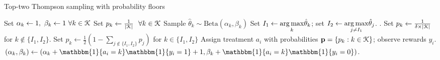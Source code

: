 \documentclass[letterpaper, 12pt, parskip=full,DIV=10]{scrartcl}
\begin{document}
\begin{algorithm} \footnotesize
    \caption{Top-two Thompson sampling with probability floors}
    \label{algg:ttts}
    \begin{algorithmic}[1] %
    	\State Set  $\alpha_{k} \leftarrow 1, \ \beta_{k} \leftarrow 1\ \forall k \in {\EuScript K}$%
			 \State Set $p_{k} \leftarrow \frac{1 }{|{\EuScript K}| } \ \ \forall k \in {\EuScript K} $ 
		\Else 	
				\State Sample $\hat \theta_k  \sim \textrm{Beta}\left(\alpha_{k}, \beta_{k} \right)$ 
			 \EndFor
			\State Set $I_1 \leftarrow \underset{k}{\operatorname*{arg\,max}} \hat\theta_k$; set $I_2 \leftarrow \underset{j\neq I_1}{\operatorname*{arg\,max}} \hat\theta_j$. . 
			\State Set $p_k \leftarrow \frac{1 }{\delta \times |{\EuScript K}| } $ for $k \notin \{ I_1, I_2\} $. 
			\State Set $p_k \leftarrow \frac{1}{2} (1-  \sum\limits_{j \notin \{ I_1, I_2\} } p_j) $ for $k \in \{ I_1, I_2\} $ 
		\EndIf
		\State Assign treatment $a_i$ with probabilities $\mathbf{p} = \{ p_k: k \in {\EuScript K} \} $; observe rewards $y_i$.
		 
			\State $(\alpha_{k}, \beta_{k}) \leftarrow (\alpha_{k} + \mathbbm{1}\{ a_i = k\}\mathbbm{1}\{ y_i = 1\} + 1,  \beta_{k} + \mathbbm{1} \{ a_i = k\}\mathbbm{1}\{ y_i = 0\})$. 
		\EndFor	
	\EndFor
    \end{algorithmic}
\end{algorithm}
\end{document}
